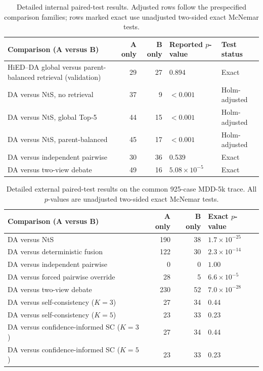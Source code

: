 \documentclass[12pt,a4paper,oneside]{report}
\begin{document}
\begin{table}[htbp]
\centering
\caption{Detailed internal paired-test results. Adjusted rows follow the prespecified comparison families; rows marked exact use unadjusted two-sided exact McNemar tests.}
\label{tab:internal-paired-tests}
\footnotesize
\renewcommand{\arraystretch}{1.08}
\begin{tabularx}{\textwidth}{|>{\raggedright\arraybackslash}X|r|r|p{2.7cm}|p{2.8cm}|}
\hline
Comparison (A versus B) & A only & B only & Reported $p$-value & Test status\\
\hline
HiED--DA global versus parent-balanced retrieval (validation) & 29 & 27 & 0.894 & Exact\\
\hline
DA versus NtS, no retrieval & 37 & 9 & $<0.001$ & Holm-adjusted\\
\hline
DA versus NtS, global Top-5 & 44 & 15 & $<0.001$ & Holm-adjusted\\
\hline
DA versus NtS, parent-balanced & 45 & 17 & $<0.001$ & Holm-adjusted\\
\hline
DA versus independent pairwise & 30 & 36 & 0.539 & Exact\\
\hline
DA versus two-view debate & 49 & 16 & $5.08\times10^{-5}$ & Exact\\
\hline
\end{tabularx}
\renewcommand{\arraystretch}{1.0}
\end{table}

\begin{table}[htbp]
\centering
\caption{Detailed external paired-test results on the common 925-case MDD-5k trace. All $p$-values are unadjusted two-sided exact McNemar tests.}
\label{tab:external-paired-tests}
\footnotesize
\renewcommand{\arraystretch}{1.08}
\begin{tabularx}{\textwidth}{|>{\raggedright\arraybackslash}X|r|r|p{3.0cm}|}
\hline
Comparison (A versus B) & A only & B only & Exact $p$-value\\
\hline
DA versus NtS & 190 & 38 & $1.7\times10^{-25}$\\
\hline
DA versus deterministic fusion & 122 & 30 & $2.3\times10^{-14}$\\
\hline
DA versus independent pairwise & 0 & 0 & $1.00$\\
\hline
DA versus forced pairwise override & 28 & 5 & $6.6\times10^{-5}$\\
\hline
DA versus two-view debate & 230 & 52 & $7.0\times10^{-28}$\\
\hline
DA versus self-consistency ($K=3$) & 27 & 34 & 0.44\\
\hline
DA versus self-consistency ($K=5$) & 23 & 33 & 0.23\\
\hline
DA versus confidence-informed SC ($K=3$) & 27 & 34 & 0.44\\
\hline
DA versus confidence-informed SC ($K=5$) & 23 & 33 & 0.23\\
\hline
\end{tabularx}
\renewcommand{\arraystretch}{1.0}
\end{table}
\end{document}
